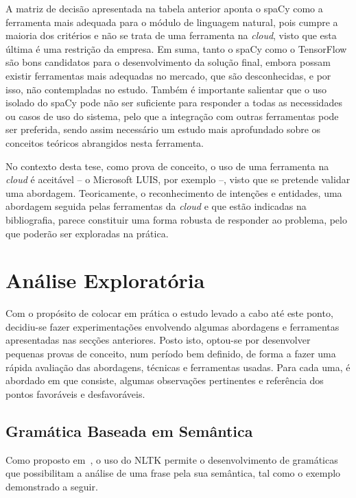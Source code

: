 A matriz de decisão apresentada na tabela anterior aponta o spaCy como a ferramenta mais adequada para o módulo de linguagem natural, pois cumpre a maioria dos critérios e não se trata de uma ferramenta na \textit{cloud}, visto que esta última é uma restrição da empresa. Em suma, tanto o spaCy como o TensorFlow são bons candidatos para o desenvolvimento da solução final, embora possam existir ferramentas mais adequadas no mercado, que são desconhecidas, e por isso, não contempladas no estudo. Também é importante salientar que o uso isolado do spaCy pode não ser suficiente para responder a todas as necessidades ou casos de uso do sistema, pelo que a integração com outras ferramentas pode ser preferida, sendo assim necessário um estudo mais aprofundado sobre os conceitos teóricos abrangidos nesta ferramenta.

No contexto desta tese, como prova de conceito, o uso de uma ferramenta na \textit{cloud} é aceitável -- o Microsoft LUIS, por exemplo --, visto que se pretende validar uma abordagem. Teoricamente, o reconhecimento de intenções e entidades, uma abordagem seguida pelas ferramentas da \textit{cloud} e que estão indicadas na bibliografia, parece constituir uma forma robusta de responder ao problema, pelo que poderão ser exploradas na prática.

\section{Análise Exploratória}
\label{sec:chap03_approaches}
Com o propósito de colocar em prática o estudo levado a cabo até este ponto, decidiu-se fazer experimentações envolvendo algumas abordagens e ferramentas apresentadas nas secções anteriores. Posto isto, optou-se por desenvolver pequenas provas de conceito, num período bem definido, de forma a fazer uma rápida avaliação das abordagens, técnicas e ferramentas usadas. Para cada uma, é abordado em que consiste, algumas observações pertinentes e referência dos pontos favoráveis e desfavoráveis.

\subsection{Gramática Baseada em Semântica}
Como proposto em~\textcite[p.~361-403]{natural_language_processing_with_python}, o uso do NLTK permite o desenvolvimento de gramáticas que possibilitam a análise de uma frase pela sua semântica, tal como o exemplo demonstrado a seguir.

